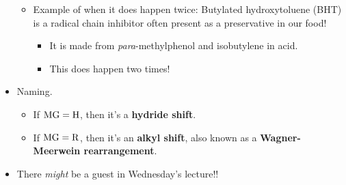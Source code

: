 \documentclass[../notes.tex]{subfiles}
\begin{document}
\begin{itemize}
\begin{itemize}
        \item Example of when it does happen twice: Butylated hydroxytoluene (BHT) is a radical chain inhibitor often present as a preservative in our food!
        \begin{itemize}
            \item It is made from \emph{para}-methylphenol and isobutylene in acid.
            \item This does happen two times!
        \end{itemize}
    \end{itemize}
    \item Naming.
    \begin{itemize}
        \item If $\ce{MG}=\ce{H}$, then it's a \textbf{hydride shift}.
        \item If $\ce{MG}=\ce{R}$, then it's an \textbf{alkyl shift}, also known as a \textbf{Wagner-Meerwein rearrangement}.
    \end{itemize}
    \item There \emph{might} be a guest in Wednesday's lecture!!
\end{itemize}
\end{document}
